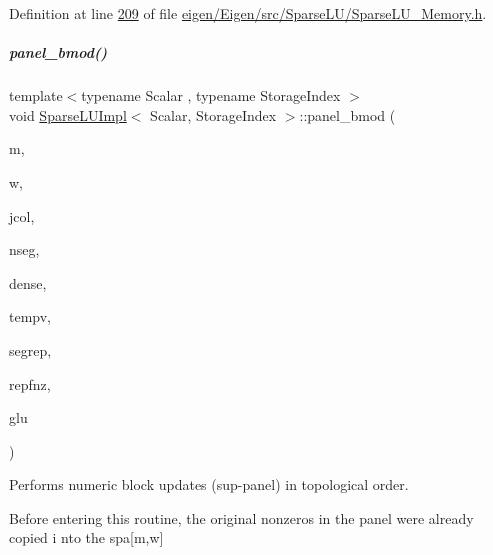 Definition at line \hyperlink{eigen_2_eigen_2src_2_sparse_l_u_2_sparse_l_u___memory_8h_source_l00209}{209} of file \hyperlink{eigen_2_eigen_2src_2_sparse_l_u_2_sparse_l_u___memory_8h_source}{eigen/\+Eigen/src/\+Sparse\+L\+U/\+Sparse\+L\+U\+\_\+\+Memory.\+h}.

\mbox{\label{group___sparse_l_u___module_a277936738db49e25285164ac25c498c3}} 
\subparagraph{\texorpdfstring{panel\+\_\+bmod()}{panel\_bmod()}}
{\footnotesize\ttfamily template$<$typename Scalar , typename Storage\+Index $>$ \\
void \hyperlink{group___sparse_l_u___module_class_eigen_1_1internal_1_1_sparse_l_u_impl}{Sparse\+L\+U\+Impl}$<$ Scalar, Storage\+Index $>$\+::panel\+\_\+bmod (\begin{DoxyParamCaption}\item[{const \hyperlink{namespace_eigen_a62e77e0933482dafde8fe197d9a2cfde}{Index}}]{m,  }\item[{const \hyperlink{namespace_eigen_a62e77e0933482dafde8fe197d9a2cfde}{Index}}]{w,  }\item[{const \hyperlink{namespace_eigen_a62e77e0933482dafde8fe197d9a2cfde}{Index}}]{jcol,  }\item[{const \hyperlink{namespace_eigen_a62e77e0933482dafde8fe197d9a2cfde}{Index}}]{nseg,  }\item[{\hyperlink{group___core___module}{Scalar\+Vector} \&}]{dense,  }\item[{\hyperlink{group___core___module}{Scalar\+Vector} \&}]{tempv,  }\item[{\hyperlink{group___core___module}{Index\+Vector} \&}]{segrep,  }\item[{\hyperlink{group___core___module}{Index\+Vector} \&}]{repfnz,  }\item[{\hyperlink{struct_eigen_1_1internal_1_1_l_u___global_l_u__t}{Global\+L\+U\+\_\+t} \&}]{glu }\end{DoxyParamCaption})\hspace{0.3cm}{\ttfamily [protected]}}



Performs numeric block updates (sup-\/panel) in topological order. 

Before entering this routine, the original nonzeros in the panel were already copied i nto the spa\mbox{[}m,w\mbox{]}


